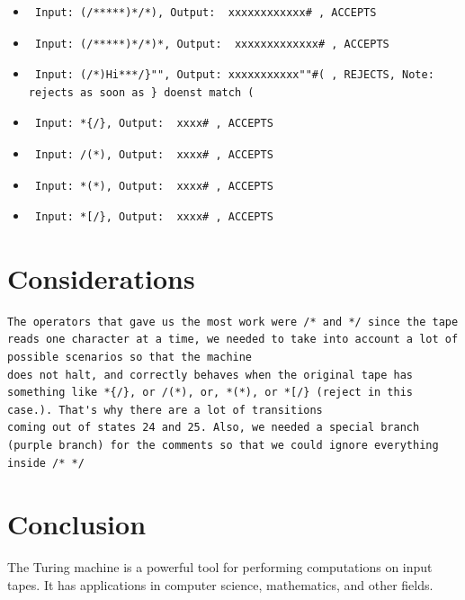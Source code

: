 \documentclass{article}
\begin{document}
\begin{itemize}
    \item \begin{verbatim} Input: (/*****)*/*), Output:  xxxxxxxxxxxx# , ACCEPTS \end{verbatim}
    \item \begin{verbatim} Input: (/*****)*/*)*, Output:  xxxxxxxxxxxxx# , ACCEPTS \end{verbatim}
    \item \begin{verbatim} Input: (/*)Hi***/}"", Output: xxxxxxxxxxx""#( , REJECTS, Note: rejects as soon as } doenst match ( \end{verbatim}
    \item \begin{verbatim} Input: *{/}, Output:  xxxx# , ACCEPTS \end{verbatim}
    \item \begin{verbatim} Input: /(*), Output:  xxxx# , ACCEPTS \end{verbatim}
    \item \begin{verbatim} Input: *(*), Output:  xxxx# , ACCEPTS \end{verbatim}
    \item \begin{verbatim} Input: *[/}, Output:  xxxx# , ACCEPTS \end{verbatim}

\end{itemize}

\section{Considerations} 
\begin{verbatim} 
The operators that gave us the most work were /* and */ since the tape reads one character at a time, we needed to take into account a lot of possible scenarios so that the machine 
does not halt, and correctly behaves when the original tape has something like *{/}, or /(*), or, *(*), or *[/} (reject in this case.). That's why there are a lot of transitions 
coming out of states 24 and 25. Also, we needed a special branch (purple branch) for the comments so that we could ignore everything inside /* */
\end{verbatim}
\section{Conclusion}
The Turing machine is a powerful tool for performing computations on input tapes. It has applications in computer science, mathematics, and other fields.
\end{document}
